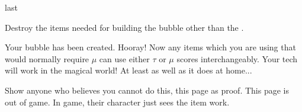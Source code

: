 \documentclass[greennotebook]{guildcamp3} %
\begin{document}
\begin{page}[at last...]{last}

Destroy the items needed for building the bubble other than the \iCauldron{}. 

Your bubble has been created. Hooray! Now any items which you are using that would normally require $\mu$ can use either $\tau$ or $\mu$ scores interchangeably. Your tech will work in the magical world! At least as well as it does at home... 

Show anyone who believes you cannot do this, this page as proof. This page is out of game. In game, their character just sees the item work. 

\end{page}



\endnotebook
\end{document}
